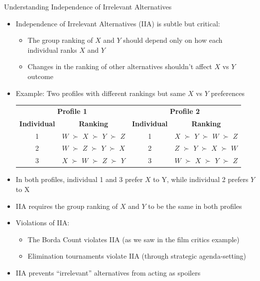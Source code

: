 \documentclass[10pt]{beamer}
\begin{document}
\begin{frame}{Understanding Independence of Irrelevant Alternatives}
  \begin{itemize}
    \item Independence of Irrelevant Alternatives (IIA) is subtle but critical:
      \begin{itemize}
        \item The group ranking of $X$ and $Y$ should depend only on how each individual ranks $X$ and $Y$
        \item Changes in the ranking of other alternatives shouldn't affect $X$ vs $Y$ outcome
      \end{itemize}
    \item Example: Two profiles with different rankings but same $X$ vs $Y$ preferences
      \begin{table}
        \center
        \begin{tabular}{cccc}
          \toprule
          \multicolumn{2}{c}{\textbf{Profile 1}} & \multicolumn{2}{c}{\textbf{Profile 2}} \\
          \textbf{Individual} & \textbf{Ranking} & \textbf{Individual} & \textbf{Ranking} \\
          \midrule
          1 & $W$ $\succ$ $X$ $\succ$ $Y$ $\succ$ $Z$ & 1 & $X$ $\succ$ $Y$ $\succ$ $W$ $\succ$ $Z$ \\
          2 & $W$ $\succ$ $Z$ $\succ$ $Y$ $\succ$ $X$ & 2 & $Z$ $\succ$ $Y$ $\succ$ $X$ $\succ$ $W$ \\
          3 & $X$ $\succ$ $W$ $\succ$ $Z$ $\succ$ $Y$ & 3 & $W$ $\succ$ $X$ $\succ$ $Y$ $\succ$ $Z$ \\
          \bottomrule
        \end{tabular}
      \end{table}
    \item In both profiles, individual 1 and 3 prefer $X$ to Y, while individual 2 prefers $Y$ to X
    \item IIA requires the group ranking of $X$ and $Y$ to be the same in both profiles
    \item Violations of IIA:
      \begin{itemize}
        \item The Borda Count violates IIA (as we saw in the film critics example)
        \item Elimination tournaments violate IIA (through strategic agenda-setting)
      \end{itemize}
    \item IIA prevents ``irrelevant'' alternatives from acting as spoilers
  \end{itemize}
\end{frame}
\end{document}
